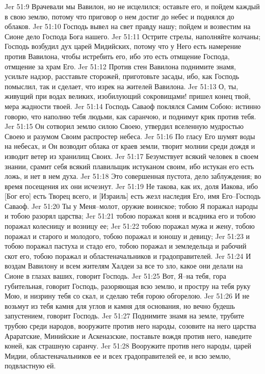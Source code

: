 Jer 51:9  Врачевали мы Вавилон, но не исцелился; оставьте его, и пойдем каждый в свою землю, потому что приговор о нем достиг до небес и поднялся до облаков.
Jer 51:10  Господь вывел на свет правду нашу; пойдем и возвестим на Сионе дело Господа Бога нашего.
Jer 51:11  Острите стрелы, наполняйте колчаны; Господь возбудил дух царей Мидийских, потому что у Него есть намерение против Вавилона, чтобы истребить его, ибо это есть отмщение Господа, отмщение за храм Его.
Jer 51:12  Против стен Вавилона поднимите знамя, усильте надзор, расставьте сторожей, приготовьте засады, ибо, как Господь помыслил, так и сделает, что изрек на жителей Вавилона.
Jer 51:13  О, ты, живущий при водах великих, изобилующий сокровищами! пришел конец твой, мера жадности твоей.
Jer 51:14  Господь Саваоф поклялся Самим Собою: истинно говорю, что наполню тебя людьми, как саранчою, и поднимут крик против тебя.
Jer 51:15  Он сотворил землю силою Своею, утвердил вселенную мудростью Своею и разумом Своим распростер небеса.
Jer 51:16  По гласу Его шумят воды на небесах, и Он возводит облака от краев земли, творит молнии среди дождя и изводит ветер из хранилищ Своих.
Jer 51:17  Безумствует всякий человек в своем знании, срамит себя всякий плавильщик истуканом своим, ибо истукан его есть ложь, и нет в нем духа.
Jer 51:18  Это совершенная пустота, дело заблуждения; во время посещения их они исчезнут.
Jer 51:19  Не такова, как их, доля Иакова, ибо [Бог его] есть Творец всего, и [Израиль] есть жезл наследия Его, имя Его--Господь Саваоф.
Jer 51:20  Ты у Меня--молот, оружие воинское; тобою Я поражал народы и тобою разорял царства;
Jer 51:21  тобою поражал коня и всадника его и тобою поражал колесницу и возницу ее;
Jer 51:22  тобою поражал мужа и жену, тобою поражал и старого и молодого, тобою поражал и юношу и девицу;
Jer 51:23  и тобою поражал пастуха и стадо его, тобою поражал и земледельца и рабочий скот его, тобою поражал и областеначальников и градоправителей.
Jer 51:24  И воздам Вавилону и всем жителям Халдеи за все то зло, какое они делали на Сионе в глазах ваших, говорит Господь.
Jer 51:25  Вот, Я--на тебя, гора губительная, говорит Господь, разоряющая всю землю, и простру на тебя руку Мою, и низрину тебя со скал, и сделаю тебя горою обгорелою.
Jer 51:26  И не возьмут из тебя камня для углов и камня для основания, но вечно будешь запустением, говорит Господь.
Jer 51:27  Поднимите знамя на земле, трубите трубою среди народов, вооружите против него народы, созовите на него царства Араратские, Минийские и Аскеназские, поставьте вождя против него, наведите коней, как страшную саранчу.
Jer 51:28  Вооружите против него народы, царей Мидии, областеначальников ее и всех градоправителей ее, и всю землю, подвластную ей.
